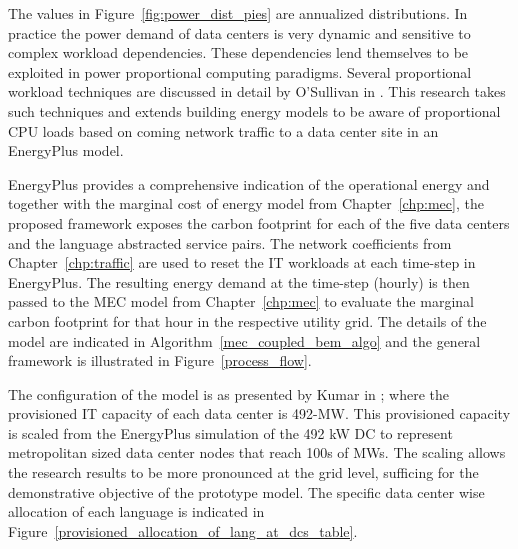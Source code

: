     
    
    The values in Figure~\ref{fig:power_dist_pies} are annualized distributions. In practice the power demand of data centers is very dynamic and sensitive to complex workload dependencies. These dependencies lend themselves to be exploited in power proportional computing paradigms. Several proportional workload techniques are discussed in detail by O'Sullivan in \cite{osullivan15}. This research takes such techniques and extends building energy models to be aware of proportional CPU loads based on coming network traffic to a data center site in an EnergyPlus model.
    
    EnergyPlus provides a comprehensive indication of the operational energy and together with the marginal cost of energy model from Chapter~\ref{chp:mec}, the proposed framework exposes the carbon footprint for each of the five data centers and the language abstracted service pairs. The network coefficients from Chapter~\ref{chp:traffic} are used to reset the IT workloads at each time-step in EnergyPlus. The resulting energy demand at the time-step (hourly) is then passed to the MEC model from Chapter~\ref{chp:mec} to evaluate the marginal carbon footprint for that hour in the respective utility grid. The details of the model are indicated in Algorithm~\ref{mec_coupled_bem_algo} and the general framework is illustrated in Figure~\ref{process_flow}. 
    
    
    
    
    
     The configuration of the model is as presented by Kumar in \cite{kumar20b}; where the provisioned IT capacity of each data center is 492-MW. This provisioned capacity is scaled from the EnergyPlus simulation of the 492 kW DC to represent metropolitan sized data center nodes that reach 100s of MWs. The scaling allows the research results to be more pronounced at the grid level, sufficing for the demonstrative objective of the prototype model. The specific data center wise allocation of each language is indicated in Figure~\ref{provisioned_allocation_of_lang_at_dcs_table}.
     
     
    
